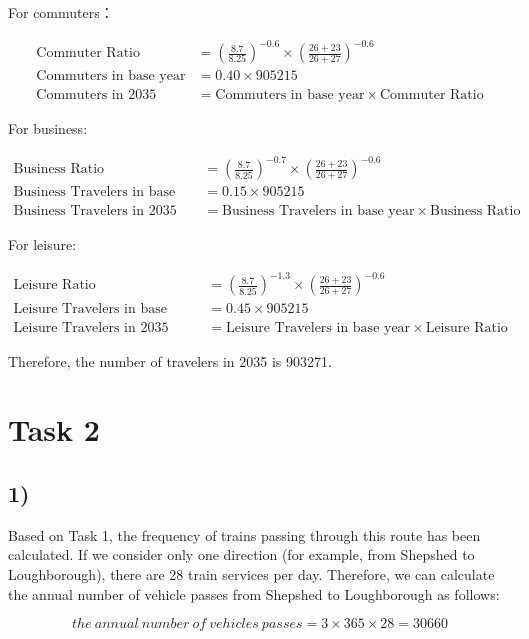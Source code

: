 \documentclass[
]{article}
\begin{document}
For commuters：

\begin{align*}
\text{Commuter Ratio} & = \left(\frac{8.7}{8.25}\right)^{-0.6} \times \left(\frac{26+23}{26+27}\right)^{-0.6} \\
\text{Commuters in base year} & = 0.40 \times 905215 \\
\text{Commuters in 2035} & = \text{Commuters in base year} \times \text{Commuter Ratio}
\end{align*}

For business:

\begin{align*}
\text{Business Ratio} & = \left(\frac{8.7}{8.25}\right)^{-0.7} \times \left(\frac{26+23}{26+27}\right)^{-0.6} \\
\text{Business Travelers in base year} & = 0.15 \times 905215 \\
\text{Business Travelers in 2035} & = \text{Business Travelers in base year} \times \text{Business Ratio}
\end{align*}

For leisure:

\begin{align*}
\text{Leisure Ratio} & = \left(\frac{8.7}{8.25}\right)^{-1.3} \times \left(\frac{26+23}{26+27}\right)^{-0.6} \\
\text{Leisure Travelers in base year} & = 0.45 \times 905215 \\
\text{Leisure Travelers in 2035} & = \text{Leisure Travelers in base year} \times \text{Leisure Ratio}
\end{align*}

Therefore, the number of travelers in 2035 is 903271.

\section{Task 2}\label{task-2}

\subsection{1)}\label{1}

Based on Task 1, the frequency of trains passing through this route has
been calculated. If we consider only one direction (for example, from
Shepshed to Loughborough), there are 28 train services per day.
Therefore, we can calculate the annual number of vehicle passes from
Shepshed to Loughborough as follows:

\[the\ annual\ number\ of\ vehicles\ passes=3\times365\times28=30660\]
\end{document}
